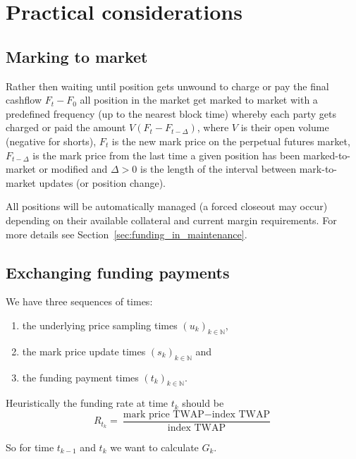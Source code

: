 \documentclass[10pt]{article}
\begin{document}
\section{Practical considerations}

\subsection{Marking to market}
Rather then waiting until position gets unwound to charge or pay the final cashflow $F_t-F_0$ all position in the market get marked to market
with a predefined frequency (up to the nearest block time) whereby each party gets charged or paid 
the amount $V(F_t-F_{t-\Delta})$, where $V$ is their open volume (negative for shorts), 
$F_t$ is the new mark price on the perpetual futures market, $F_{t-\Delta}$ is the mark price from the last time a given position has been marked-to-market or modified
and $\Delta>0$ is the length of the interval between mark-to-market updates (or position change).

All positions will be automatically managed (a forced closeout may occur) depending on their available collateral and current margin requirements. 
For more details see Section~\ref{sec:funding_in_maintenance}.

\subsection{Exchanging funding payments}\label{sec:funding_payment}

We have three sequences of times: 
\begin{enumerate}
    \item the underlying price sampling times $(u_k)_{k \in \mathbb N}$,
    \item the mark price update times $(s_k)_{k\in \mathbb N}$ and
    \item the funding payment times $(t_k)_{k\in \mathbb N}$.
\end{enumerate}

Heuristically the funding rate at time $t_k$ should be
\[
R_{t_k} = \frac{\text{mark price TWAP} - \text{index TWAP}}{\text{index TWAP}}
\]

So for time $t_{k-1}$ and $t_k$ we want to calculate $G_k$. 
\end{document}
